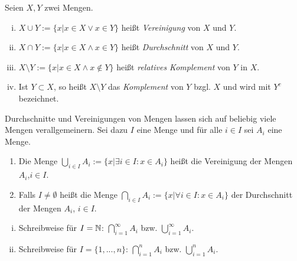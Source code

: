 \begin{mydef}
    Seien $X,Y$ zwei Mengen. 
    \begin{enumerate}[(i)]
        \item  
        $X \cup Y := \{x | x \in X \vee x \in Y\}$ heißt \textit{Vereinigung} von $X$ und $Y$. 
        \item 
        $X \cap Y := \{x | x \in X \wedge x \in Y\}$ heißt \textit{Durchschnitt} von $X$ und $Y$. 
        \item 
        $X \setminus Y := \{x | x \in X \wedge x \notin Y\}$ heißt \textit{relatives Komplement} von $Y$ in $X$. 
        \item 
        Ist $Y \subset X$, so heißt $X \setminus Y$ das \textit{Komplement} von $Y$ bzgl. $X$ und wird mit $Y^c$ bezeichnet. 
    \end{enumerate}
\end{mydef}

\begin{mydef}
    Durchschnitte und Vereinigungen von Mengen lassen sich auf beliebig viele Mengen verallgemeinern. 
    Sei dazu $I$ eine Menge und für alle $i \in I$ sei $A_i$ eine Menge. 
    \begin{enumerate}
        \item 
        Die Menge $\bigcup_{i \in I}A_i := \{x | \exists i \in I: x \in A_i\}$ heißt die Vereinigung der Mengen $A_i$,$i \in I$. 
        \item 
        Falls $I \neq \emptyset$ heißt die Menge $\bigcap_{i \in I}A_i := \{x | \forall i \in I: x \in A_i\}$  der Durchschnitt der Mengen $A_i$, $i \in I$.

    \end{enumerate} 
\end{mydef}

\begin{remark}
    \begin{enumerate}[(i)]
        \item 
        Schreibweise für $I = \mathbb{N}$: $\bigcap_{i=1}^{\infty}A_i$ bzw. $\bigcup_{i=1}^{\infty}A_i$.
        \item 
        Schreibweise für $I = \{1,...,n\}$: $\bigcap_{i=1}^n A_i$ bzw. $\bigcup_{i=1}^n A_i$.
    \end{enumerate}
\end{remark}